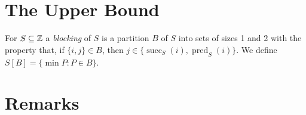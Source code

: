 \documentclass{patmorin}
\DeclareMathOperator{\cw}{succ}
\DeclareMathOperator{\ccw}{pred}
\begin{document}
\section{The Upper Bound}

For $S\subseteq\mathbb{Z}$ a \emph{blocking} of $S$ is a partition $B$ of $S$
into sets of sizes 1 and 2 with the property that, if $\{i,j\}\in B$, then
$j\in\{\cw_S(i),\ccw_S(i)\}$.  We define $S[B] = \{\min P : P\in B\}$.  


\section{Remarks}



\end{document}
